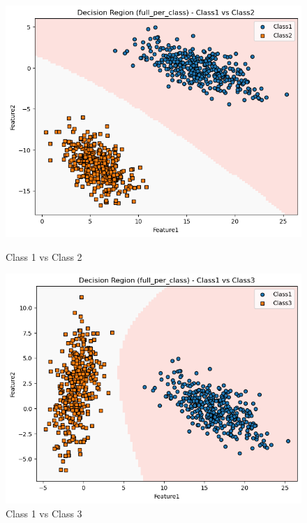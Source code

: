 \begin{figure}[H]
    \centering
    \begin{minipage}{0.32\linewidth}
        \includegraphics[width=\linewidth]{images/LS_Group04_images/04_full_per_class/02_decision_region_c1_c2.png}
        \caption*{Class 1 vs Class 2}
    \end{minipage}
    \hfill
    \begin{minipage}{0.32\linewidth}
        \includegraphics[width=\linewidth]{images/LS_Group04_images/04_full_per_class/03_decision_region_c1_c3.png}
        \caption*{Class 1 vs Class 3}
    \end{minipage}
    \hfill

\end{figure}
